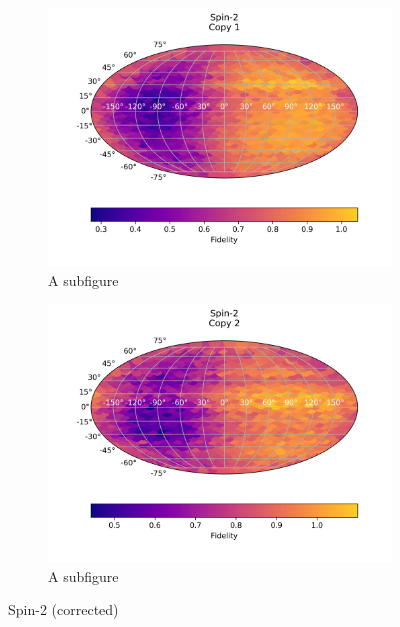 \begin{figure}[H]
    \centering
    \begin{subfigure}{.5\textwidth}
      \centering
      \includegraphics[width=\textwidth]{Figures/Economical/Spin2/FullSphere/results_spin2_corrected.txt_copy1.png}
      \caption{A subfigure}
      \label{fig:ec_pin2_sphere_1_corrected}
    \end{subfigure}%
    \begin{subfigure}{.5\textwidth}
      \centering
      \includegraphics[width=\textwidth]{Figures/Economical/Spin2/FullSphere/results_spin2_corrected.txt_copy2.png}
      \caption{A subfigure}
      \label{fig:ec_spin2_sphere_2_corrected}
    \end{subfigure}
    \caption{Spin-2 (corrected)}
    \label{fig:ec_spin2_sphere_corrected}
\end{figure}

